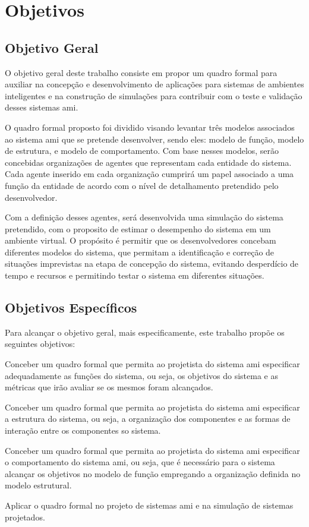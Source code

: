 \section{Objetivos}
\label{sec:objetivos}


\subsection{Objetivo Geral}
\label{sec:objetivo-geral}

    O objetivo geral deste trabalho consiste em propor um quadro formal para auxiliar na concepção e desenvolvimento de aplicações para sistemas de ambientes inteligentes e na construção de simulações para contribuir com o teste e validação desses sistemas \acrshort{ami}.
    
    O quadro formal proposto foi dividido visando levantar três  modelos associados ao sistema \acrshort{ami} que se pretende desenvolver, sendo eles: modelo de função, modelo de estrutura, e modelo de comportamento. Com base nesses modelos, serão concebidas organizações de agentes que representam cada entidade do sistema. Cada agente inserido em cada organização cumprirá um papel associado a uma função da entidade de acordo com o nível de detalhamento pretendido pelo desenvolvedor. 
    
    Com a definição desses agentes, será desenvolvida uma simulação do sistema pretendido, com o proposito de estimar o desempenho do sistema em um ambiente virtual. O propósito é permitir que os desenvolvedores concebam diferentes modelos do sistema, que permitam a identificação e correção de situações imprevistas na etapa de concepção do sistema, evitando desperdício de tempo e recursos e permitindo testar o sistema em diferentes situações.  

\subsection{Objetivos Específicos}
\label{sec:objetivos-especificos}

    Para alcançar o objetivo geral, mais especificamente, este trabalho propõe os seguintes objetivos:
    
    \begin{alineas}
		\item Conceber um quadro formal que permita ao projetista do sistema \acrshort{ami} especificar adequadamente as funções do sistema, ou seja, os objetivos do sistema e as métricas que irão avaliar se os mesmos foram alcançados. 
		\item Conceber um quadro formal que permita ao projetista do sistema \acrshort{ami} especificar a estrutura do sistema, ou seja, a organização dos componentes e as formas de interação entre os componentes so sistema.
		\item Conceber um quadro formal que permita ao projetista do sistema \acrshort{ami} especificar o comportamento do sistema \acrshort{ami}, ou seja, que é necessário para o sistema alcançar os objetivos no modelo de função empregando a organização definida no modelo estrutural.
		\item Aplicar o quadro formal no projeto de sistemas \acrshort{ami} e na simulação de sistemas projetados.
	\end{alineas}